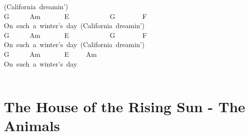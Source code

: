 \documentclass[]{book}
\let\stdsection\section
\renewcommand\section{\clearpage\stdsection}
\begin{document}
\hspace*{0.333em}\hspace*{0.333em}\hspace*{0.333em}\hspace*{0.333em}\hspace*{0.333em}\hspace*{0.333em}\hspace*{0.333em}\hspace*{0.333em}\hspace*{0.333em}\hspace*{0.333em}\hspace*{0.333em}\hspace*{0.333em}\hspace*{0.333em}\hspace*{0.333em}(California~dreamin')\\
\hspace*{0.333em}\hspace*{0.333em}\hspace*{0.333em}G~~~~~~Am~~~~~~~E~~~~~~~~~~~~G~~~~~~~~F\\
On~such~a~winter's~day~(California~dreamin')\\
\hspace*{0.333em}\hspace*{0.333em}\hspace*{0.333em}G~~~~~~Am~~~~~~~E~~~~~~~~~~~~G~~~~~~~~F\\
On~such~a~winter's~day~(California~dreamin')\\
\hspace*{0.333em}\hspace*{0.333em}\hspace*{0.333em}G~~~~~~Am~~~~~~~E~~~~~Am\\
On~such~a~winter's~day\\
~\\

\hypertarget{the-house-of-the-rising-sun---the-animals}{%
\section{The House of the Rising Sun - The Animals}\label{the-house-of-the-rising-sun---the-animals}}
\end{document}
